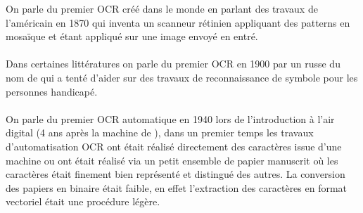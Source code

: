 
On parle du premier OCR créé dans le monde en parlant des travaux de l'américain  en 1870 qui inventa un scanneur rétinien appliquant des patterns en mosaïque et étant appliqué sur une image envoyé en entré.\\
\\
Dans certaines littératures on parle du premier OCR en 1900 par un russe du nom de  qui a tenté d'aider sur des travaux de reconnaissance de symbole pour les personnes handicapé.\\
\\
On parle du premier OCR automatique en 1940 lors de l'introduction à l'air digital (4 ans après la machine de ), dans un premier temps  les travaux d'automatisation OCR ont était réalisé directement des caractères issue d'une machine ou ont était réalisé via un petit ensemble de papier manuscrit où les caractères était finement bien représenté et distingué des autres. La conversion des papiers en binaire était faible, en effet l'extraction des caractères en format vectoriel était une procédure légère.\\
\\


\pagebreak